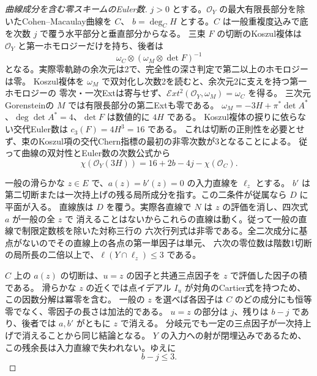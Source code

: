 \begin{proof}[曲線成分を含む零スキームのEuler数]
$j>0$ とする。$\mathcal O_Y$ の最大有限長部分を除いたCohen--Macaulay曲線を $C$、
$b=\deg_C H$ とする。$C$ は一般重複度込みで底を次数 $j$ で覆う水平部分と垂直部分からなる。
三束 $F$ の切断のKoszul複体は $\mathcal O_Y$ と第一ホモロジーだけを持ち、後者は
\[
               \omega_C\otimes(\omega_M\otimes\det F)^{-1}
\]
となる。実際零軌跡の余次元は2で、完全性の深さ判定で第二以上のホモロジーは零。
Koszul複体を $\omega_M$ で双対化し次数2を読むと、余次元2に支えを持つ第一ホモロジーの
零次・一次Extは寄与せず、$\mathcal E xt^2(\mathcal O_Y,\omega_M)=\omega_C$ を得る。
三次元Gorensteinの $M$ では有限長部分の第二Extも零である。
$\omega_M=-3H+\pi^*\det A^*$、$\deg\det A^*=4$、$\det F$ は数値的に $4H$ である。
Koszul複体の捩りに依らない交代Euler数は $c_3(F)=4H^3=16$ である。
これは切断の正則性を必要とせず、束のKoszul項の交代Chern指標の最初の非零次数が3となることによる。
従って曲線の双対性とEuler数の次数公式から
\[
       \chi(\mathcal O_Y(3H))=16+2b-4j-\chi(\mathcal O_C).                 \tag{1}
\]

一般の滑らかな $z\in E$ で、$a(z)=b'(z)=0$ の入力直線を $\ell_z$ とする。
$b'$ は第二切断または一次持上げの残る局所成分を指す。この二条件が従属なら $D$ に平面が入る。
直線族は $D$ を覆う。実際各直線で $N$ は $z$ の評価を消し、四次式 $a$ が一般の全 $z$ で
消えることはないからこれらの直線は動く。従って一般の直線で制限定数核を除いた対称三行の
六次行列式は非零である。全二次成分に基点がないのでその直線上の各点の第一単因子は単元、
六次の零位数は階数1切断の局所長の二倍以上で、$\ell(Y\cap\ell_z)\le3$ である。

$C$ 上の $a(z)$ の切断は、$u=z$ の因子と共通三点因子を $z$ で評価した因子の積である。
滑らかな $z$ の近くでは点イデアル $I_u$ が対角のCartier式を持つため、この因数分解は冪零を含む。
一般の $z$ を選べば各因子は $C$ のどの成分にも恒等零でなく、零因子の長さは加法的である。
$u=z$ の部分は $j$、残りは $b-j$ であり、後者では $a,b'$ がともに $z$ で消える。
分岐元でも一定の三点因子が一次持上げで消えることから同じ結論となる。
$Y$ の入力への射が閉埋込みであるため、この残余長は入力直線で失われない。ゆえに
\[
                              b-j\le3 .                                     \tag{2}
\]
\end{proof}

